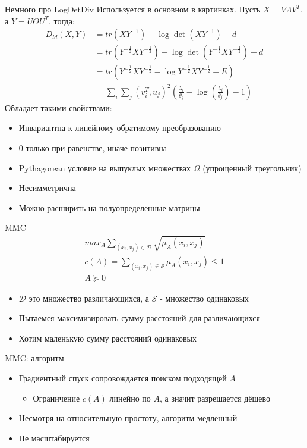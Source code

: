 \documentclass[14pt, fleqn, xcolor={dvipsnames, table}]{beamer}
\begin{document}
\begin{frame}{Немного про LogDetDiv}
\footnotesize
Используется в основном в картинках. Пусть $X = V \Lambda V^T$, а $Y = U \Theta U^T$, тогда:
$$\begin{array}{rl}
D_{ld}(X,Y) &= tr(XY^{-1}) - \log \det(XY^{-1}) - d \\
&= tr(Y^{-\frac{1}{2}}XY^{-\frac{1}{2}})  - \log \det (Y^{-\frac{1}{2}}XY^{-\frac{1}{2}}) - d \\
&= tr(Y^{-\frac{1}{2}}XY^{-\frac{1}{2}} - \log Y^{-\frac{1}{2}}XY^{-\frac{1}{2}} - E) \\
&= \sum_i\sum_j(v^T_i, u_j)^2\left(\frac{\lambda_i}{\theta_j} - \log(\frac{\lambda_i}{\theta_j}) - 1\right)
\end{array}$$
Обладает такими свойствами:
\begin{itemize}
\item Инвариантна к линейному обратимому преобразованию
\item 0 только при равенстве, иначе позитивна
\item Pythagorean условие на выпуклых множествах $\Omega$ (упрощенный треугольник)
\item Несимметрична
\item Можно расширить на полуопределенные матрицы
\end{itemize}
\end{frame}

\begin{frame}{MMC}
$$\begin{array}{l}
max_A \sum_{(x_i, x_j) \in \mathcal{D}} \sqrt{\mu_A(x_i, x_j)} \\
c(A) = \sum_{(x_i, x_j) \in \mathcal{S}} \mu_A(x_i, x_j) \le 1 \\
A \succeq 0
\end{array}$$

\begin{itemize}
  \item $\mathcal{D}$ это множество различающихся, а $\mathcal{S}$ - множество одинаковых
  \item Пытаемся максимизировать сумму расстояний для различающихся
  \item Хотим маленькую сумму расстояний одинаковых
\end{itemize}
\end{frame}


\begin{frame}{MMC: алгоритм}
\begin{itemize}
  \item Градиентный спуск сопровождается поиском подходящей $A$
  \begin{itemize}
    \item Ограничение $c(A)$ линейно по $A$, а значит разрешается дёшево
  \end{itemize}
  \item Несмотря на относительную простоту, алгоритм медленный
  \item Не масштабируется
\end{itemize}
\end{frame}
\end{document}
